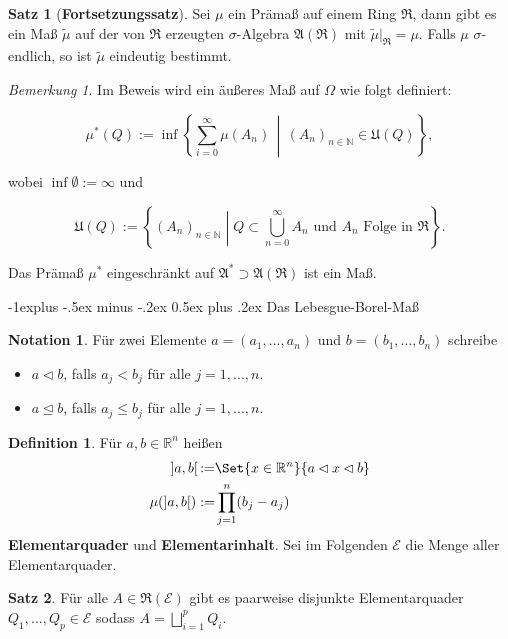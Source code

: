 \documentclass[a4paper,10pt,landscape]{article}
\makeatletter
\newcommand{\R}{\mathbb{R}}
\newcommand{\N}{\mathbb{N}}
\newcommand{\Alg}{\mathfrak{A}}
\newcommand{\Ring}{\mathfrak{R}}
\theoremstyle{definition}
\newtheorem*{nota}{Notation}
\newtheorem*{defn}{Definition}
\newtheorem*{satz}{Satz}
\theoremstyle{remark}
\newtheorem*{bem}{Bemerkung}
\renewcommand{\emph}[1]{\textcolor{Emph}{\bf{#1}}}
\renewcommand{\subsection}{\@startsection{subsection}{2}{0mm}%
                                {-1explus -.5ex minus -.2ex}%
                                {0.5ex plus .2ex}%
                                {\normalfont\normalsize\bfseries}}
\makeatother
\begin{document}
\begin{multicols}{3}
\begin{satz}[\emph{Fortsetzungssatz}]
  Sei $\mu$ ein Prämaß auf einem Ring $\Ring$, dann gibt es ein Maß $\tilde{\mu}$ auf der von $\Ring$ erzeugten $\sigma$-Algebra $\Alg(\Ring)$ mit $\tilde{\mu}|_\Ring = \mu$. Falls $\mu$ $\sigma$-endlich, so ist $\tilde{\mu}$ eindeutig bestimmt.
\end{satz}

\begin{bem}
  Im Beweis wird ein äußeres Maß auf $\Omega$ wie folgt definiert:

  \[ \mu^*(Q) := \inf \left\{ \sum_{i = 0}^\infty \mu(A_n) \,\middle|\, (A_n)_{n \in \N} \in \mathfrak{U}(Q) \right\}, \]

  wobei $\inf \emptyset := \infty$ und

  \[ \mathfrak{U}(Q) := \left\{ (A_n)_{n \in \N} \middle| Q \subset \bigcup_{n = 0}^\infty A_n \text{ und } A_n \text{ Folge in } \Ring \right\}. \]

  Das Prämaß $\mu^*$ eingeschränkt auf $\Alg^* \supset \Alg(\Ring)$ ist ein Maß.
\end{bem}


\subsection{Das Lebesgue-Borel-Maß}

\begin{nota}
  Für zwei Elemente $a = (a_1, ..., a_n)$ und $b = (b_1, ..., b_n)$ schreibe
  \begin{itemize}
    \item $a \lhd b$, falls $a_j < b_j$ für alle $j = 1, ..., n$.
    \item $a \unlhd b$, falls $a_j \leq b_j$ für alle $j = 1, ..., n$.
  \end{itemize}
\end{nota}

\begin{defn}
  Für $a, b \in \R^n$ heißen
  \begin{align*}
    ]a, b[\,:=& \Set{ x \in \R^n }{ a \lhd x \lhd b }\\
    \mu(]a, b[) :=& \prod_{j = 1}^{n} (b_j - a_j)
  \end{align*}
  \emph{Elementarquader} und \emph{Elementarinhalt}. Sei im Folgenden $\mathcal{E}$ die Menge aller Elementarquader.
\end{defn}

\begin{satz}
  Für alle $A \in \Ring(\mathcal{E})$ gibt es paarweise disjunkte Elementarquader $Q_1, ..., Q_p \in \mathcal{E}$ sodass $A = \bigsqcup_{i = 1}^p Q_i$.
\end{satz}


\end{multicols}
\end{document}
